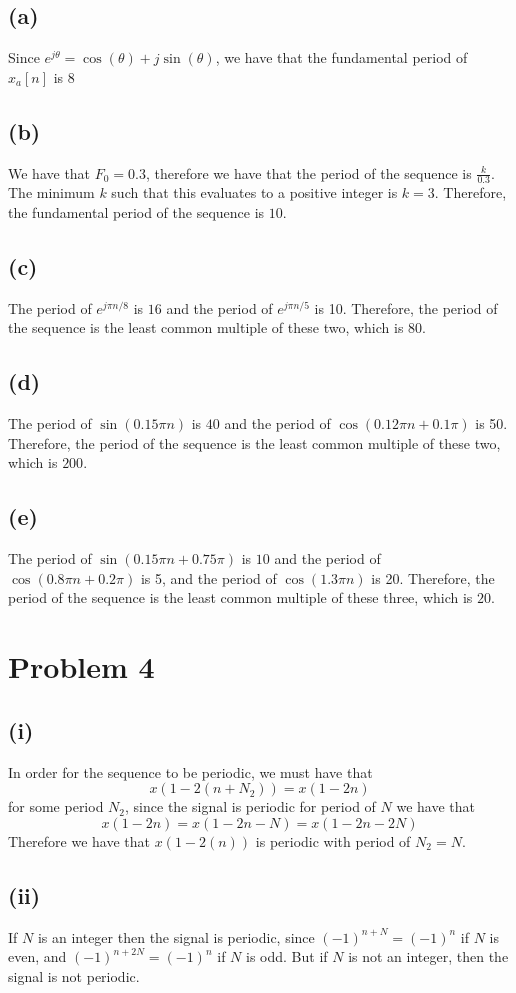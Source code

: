 \subsection*{(a)}
Since $e^{j\theta} = \cos(\theta) + j\sin(\theta)$, we have
that the fundamental period of $\hat{x}_a[n]$ is $\boxed{8}$
\subsection*{(b)}
We have that $F_0=0.3$, therefore we have that the period of the sequence
is $\frac{k}{0.3}$. The minimum $k$ such that this evaluates to a
positive integer is $k=3$. Therefore, the fundamental period of
the sequence is $\boxed{10}$.
\subsection*{(c)}
The period of $e^{j\pi n /8}$ is $16$ and the period of
 $e^{j\pi n /5}$ is 10. Therefore, the period of the sequence
 is the least common multiple of these two, which is $\boxed{80}$. 
\subsection*{(d)}
The period of $\sin(0.15\pi n)$ is $40$ and the period of
 $\cos(0.12\pi n+0.1\pi)$ is 50. Therefore, the period of the sequence
 is the least common multiple of these two, which is $\boxed{200}$. 
\subsection*{(e)}
The period of $\sin(0.15\pi n+0.75\pi)$ is $10$ and the period of
 $\cos(0.8\pi n+0.2\pi)$ is 5, and the period of $\cos(1.3\pi n)$ is 20. Therefore, the period of the sequence
 is the least common multiple of these three, which is $\boxed{20}$.
 \section*{Problem 4}
 \subsection*{(i)}
 In order for the sequence to be periodic, we must have that
 $$x(1-2(n+N_2)) = x(1-2n)$$
 for some period $N_2$, since the signal is periodic for period of 
 $N$ we have that
 $$x(1-2n)=x(1-2n-N)=x(1-2n-2N)$$
 Therefore we have that $x(1-2(n))$ is periodic with period of $N_2=N$.
\subsection*{(ii)}
If $N$ is an integer then the signal is periodic, since $(-1)^{n+N}=(-1)^{n}$
if $N$ is even, and $(-1)^{n+2N}=(-1)^{n}$ if $N$ is odd. But if 
$N$ is not an integer, then the signal is not periodic.







